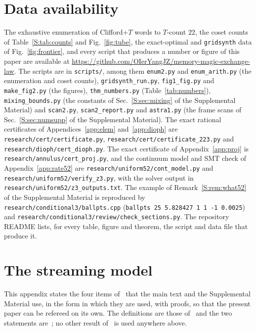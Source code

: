 \documentclass[aps,prx,twocolumn,superscriptaddress,nofootinbib,longbibliography]{revtex4-2}
\theoremstyle{plain}
\theoremstyle{definition}
\theoremstyle{remark}
\begin{document}
\section*{Data availability}
{\raggedright
The exhaustive enumeration of Clifford+$T$ words to $T$-count $22$, the coset counts of Table~\ref{S:tab:counts} and Fig.~\ref{fig:tube}, the exact-optimal and \texttt{gridsynth} data of Fig.~\ref{fig:frontier}, and every script that produces a number or figure of this paper are available at \url{https://github.com/OIerYangJZ/memory-magic-exchange-law}. The scripts are in \texttt{scripts/}, among them \texttt{enum2.py} and \texttt{enum\_arith.py} (the enumeration and coset counts), \texttt{gridsynth\_run.py}, \texttt{fig1\_fig.py} and \texttt{make\_fig2.py} (the figures), \texttt{thm\_numbers.py} (Table~\ref{tab:numbers}), \texttt{mixing\_bounds.py} (the constants of Sec.~\ref{S:sec:mixing} of the Supplemental Material) and \texttt{scan2.py}, \texttt{scan2\_report.py} and \texttt{astra1.py} (the frame scans of Sec.~\ref{S:sec:numsupp} of the Supplemental Material). The exact rational certificates of Appendices~\ref{app:elem} and~\ref{app:dioph} are \texttt{research/cert/certificate.py}, \texttt{research/cert/certificate\_223.py} and \texttt{research/dioph/cert\_dioph.py}. The exact certificate of Appendix~\ref{app:proj} is \texttt{research/annulus/cert\_proj.py}, and the continuum model and SMT check of Appendix~\ref{app:rate52} are \texttt{research/uniform52/cont\_model.py} and \texttt{research/uniform52/verify\_z3.py}, with the solver output in \texttt{research/uniform52/z3\_outputs.txt}. The example of Remark~\ref{S:rem:what52} of the Supplemental Material is reproduced by \texttt{research/conditional3/ballpts.cpp} (\texttt{ballpts 25 5.828427 1 1 -1 0.0025}) and \texttt{research/conditional3/review/check\_sections.py}. The repository README lists, for every table, figure and theorem, the script and data file that produce it.\par}


\appendix

\section{The streaming model}\label{app:model}

This appendix states the four items of~\cite{Paper1} that the main text and the Supplemental Material use, in the form in which they are used, with proofs, so that the present paper can be refereed on its own. The definitions are those of~\cite[Def.~9, 13, 20, 21]{Paper1} and the two statements are~\cite[Lem.~1, Prop.~10]{Paper1}; no other result of~\cite{Paper1} is used anywhere above.
\end{document}
